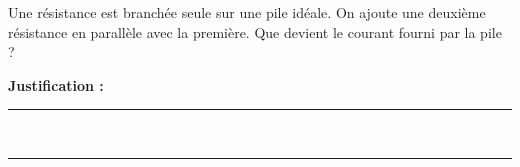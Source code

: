 Une résistance est branchée seule sur une pile idéale. On ajoute une deuxième résistance en parallèle avec la première. Que devient le courant fourni par la pile ?

\choices

\noindent\textbf{Justification :} \hrulefill \\[2.5ex]
\rule{\linewidth}{0.4pt} \\[2.5ex]
\rule{\linewidth}{0.4pt}
\vfill
